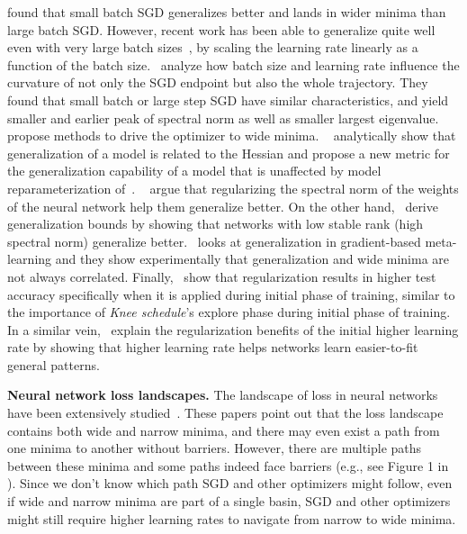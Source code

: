 \documentclass[twoside,11pt]{article}
\newcommand{\lrschedule}{\textit{Knee schedule}}
\begin{document}
\citet{keskar2016large} found that small batch SGD generalizes better and lands in wider minima than large batch SGD. However, recent work has been able to generalize quite well even with very large batch sizes~\citep{goyal-imagenet-in-an-hour-2017,large-batch-training-openai-2018,large-batch-training-google-2018}, by scaling the learning rate linearly as a function of the batch size.~\citet{jastrzebski_iclr_2019}
analyze how batch size and learning rate influence the curvature of not only the SGD endpoint but also the whole trajectory. They found that small batch or large step SGD have similar characteristics, and yield smaller and earlier peak of spectral norm as well as smaller largest eigenvalue.~\citet{chaudhari2019entropy,shapinglandscape2019baldassi} propose methods to drive the optimizer to wide minima. ~\citet{wang2018identifying} analytically show that generalization of a model is related to the Hessian and propose a new metric for the generalization capability of a model that is unaffected by model reparameterization of~\citet{dinh2017sharp}. ~\citet{yoshida2017spectral} argue that regularizing the spectral norm of the weights of the neural network help them generalize better. On the other hand,~\citet{arora2018stronger} derive generalization bounds by showing that networks with low stable rank (high spectral norm) generalize better.~\citet{guiroy2019towards} looks at generalization in gradient-based meta-learning and they show experimentally that generalization and wide minima are not always correlated. 
Finally,~\citet{golatkar2019time} show that regularization results in higher test accuracy specifically when it is applied during initial phase of training, similar to the importance of \lrschedule{}'s explore phase during initial phase of training. In a similar vein,~\citet{li2019towards} explain the regularization benefits of the initial higher learning rate by showing that higher learning rate helps networks learn easier-to-fit general patterns. 




\noindent
{\bf Neural network loss landscapes.}
The landscape of loss in neural networks have been extensively studied~\citep{draxler2018essentially, freeman2016topology,garipov2018loss,sagun2017empirical}. These papers point out that the loss landscape contains both wide and narrow minima, and there may even exist a path from one minima to another without barriers. However, there are multiple paths between these minima and some paths indeed face barriers 
(e.g., see Figure 1 in \citet{draxler2018essentially}). Since we don't know which path SGD and other optimizers might follow, even if wide and narrow minima are part of a single basin, SGD and other optimizers might still require higher learning rates to navigate from narrow to wide minima.
\end{document}
